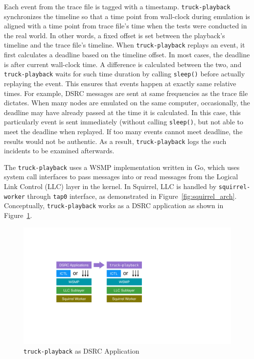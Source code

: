 \documentclass[12pt]{report}
\begin{document}
Each event from the trace file is tagged with a timestamp. \texttt{truck-playback} synchronizes the timeline so that a time point from wall-clock during emulation is aligned with a time point from trace file's time when the tests were conducted in the real world. In other words, a fixed offset is set between the playback's timeline and the trace file's timeline. When \texttt{truck-playback} replays an event, it first calculates a deadline based on the timeline offset. In most cases, the deadline is after current wall-clock time. A difference is calculated between the two, and \texttt{truck-playback} waits for such time duration by calling \texttt{sleep()} before actually replaying the event. This ensures that events happen at exactly same relative times. For example, DSRC messages are sent at same frequencies as the trace file dictates. When many nodes are emulated on the same computer, occasionally, the deadline may have already passed at the time it is calculated. In this case, this particularly event is sent immediately (without calling \texttt{sleep()}, but not able to meet the deadline when replayed. If too many events cannot meet deadline, the results would not be authentic. As a result, \texttt{truck-playback} logs the such incidents to be examined afterwards.

The \texttt{truck-playback} uses a WSMP implementation written in Go, which uses system call interfaces to pass messages into or read messages from the Logical Link Control (LLC) layer in the kernel. In Squirrel, LLC is handled by \texttt{squirrel-worker} through \texttt{tap0} interface, as demonstrated in Figure~\ref{fig:squirrel_arch}. Conceptually, \texttt{truck-playback} works as a DSRC application as shown in Figure~\ref{fig:playback_arch}.

\begin{figure}[h]
  \begin{center}
    \includegraphics[width=.6\textwidth]{figures/playback_arch.pdf}
    \caption{\label{fig:playback_arch}\texttt{truck-playback} as DSRC Application}
  \end{center}
\end{figure}
\end{document}
